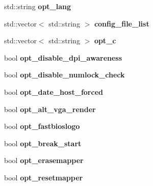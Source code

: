\begin{DoxyCompactItemize}
\item 
\hypertarget{classConfig_a077860660ed77a40cf5ff1540873d9d6}{std\-::string {\bfseries opt\-\_\-lang}}\label{classConfig_a077860660ed77a40cf5ff1540873d9d6}

\item 
\hypertarget{classConfig_a4842020c7194c3b5c02980c2cd7c59d5}{std\-::vector$<$ std\-::string $>$ {\bfseries config\-\_\-file\-\_\-list}}\label{classConfig_a4842020c7194c3b5c02980c2cd7c59d5}

\item 
\hypertarget{classConfig_ace110896f67f0404622ef497e652ea3b}{std\-::vector$<$ std\-::string $>$ {\bfseries opt\-\_\-c}}\label{classConfig_ace110896f67f0404622ef497e652ea3b}

\item 
\hypertarget{classConfig_a64fd0847634fc174dbd521607116a0c7}{bool {\bfseries opt\-\_\-disable\-\_\-dpi\-\_\-awareness}}\label{classConfig_a64fd0847634fc174dbd521607116a0c7}

\item 
\hypertarget{classConfig_a9265412e49f5228d63c506ceab66a6c2}{bool {\bfseries opt\-\_\-disable\-\_\-numlock\-\_\-check}}\label{classConfig_a9265412e49f5228d63c506ceab66a6c2}

\item 
\hypertarget{classConfig_a84bdd8a5d672f1e15b2ac8f5eca497ff}{bool {\bfseries opt\-\_\-date\-\_\-host\-\_\-forced}}\label{classConfig_a84bdd8a5d672f1e15b2ac8f5eca497ff}

\item 
\hypertarget{classConfig_a5c66912f39283a6b2b4ebc87867cfc91}{bool {\bfseries opt\-\_\-alt\-\_\-vga\-\_\-render}}\label{classConfig_a5c66912f39283a6b2b4ebc87867cfc91}

\item 
\hypertarget{classConfig_a7a559bbc38f1b51bef7115e31405da2c}{bool {\bfseries opt\-\_\-fastbioslogo}}\label{classConfig_a7a559bbc38f1b51bef7115e31405da2c}

\item 
\hypertarget{classConfig_abbaadb9fcb5ab3065a8728cf271e4bc8}{bool {\bfseries opt\-\_\-break\-\_\-start}}\label{classConfig_abbaadb9fcb5ab3065a8728cf271e4bc8}

\item 
\hypertarget{classConfig_ae4e0136fb9b65400cb317f60e3c1b64d}{bool {\bfseries opt\-\_\-erasemapper}}\label{classConfig_ae4e0136fb9b65400cb317f60e3c1b64d}

\item 
\hypertarget{classConfig_af9f2964b9f782effb00e13a8c33af411}{bool {\bfseries opt\-\_\-resetmapper}}\label{classConfig_af9f2964b9f782effb00e13a8c33af411}


\end{DoxyCompactItemize}
